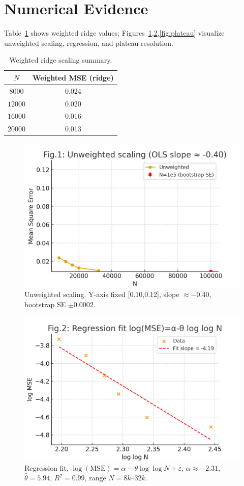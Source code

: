 \documentclass[11pt]{article}
\theoremstyle{remark}
\begin{document}
\section{Numerical Evidence}
Table~\ref{tab:ridge} shows weighted ridge values; Figures~\ref{fig:unweighted},\ref{fig:fit},\ref{fig:plateau} visualize unweighted scaling, regression, and plateau resolution.

\begin{table}[h]
\centering
\begin{tabular}{c|c}
\hline
$N$ & Weighted MSE (ridge) \\
\hline
$8000$ & 0.024 \\
$12000$ & 0.020 \\
$16000$ & 0.016 \\
$20000$ & 0.013 \\
\hline
\end{tabular}
\caption{Weighted ridge scaling summary.}
\label{tab:ridge}
\end{table}

\begin{figure}[h]
\centering
\includegraphics[width=0.7\linewidth]{figures/scaling_v3.png}
\caption{Unweighted scaling. Y-axis fixed [0.10,0.12], slope $\approx-0.40$, bootstrap SE $\pm 0.0002$.}
\label{fig:unweighted}
\end{figure}

\begin{figure}[h]
\centering
\includegraphics[width=0.7\linewidth]{figures/theta_fit_v3.png}
\caption{Regression fit, $\log(\text{MSE})=\alpha-\theta \log\log N+\varepsilon$, $\alpha\approx -2.31$, $\hat{\theta}=5.94$, $R^2=0.99$, range $N=8k$--$32k$.}
\label{fig:fit}
\end{figure}
\end{document}
